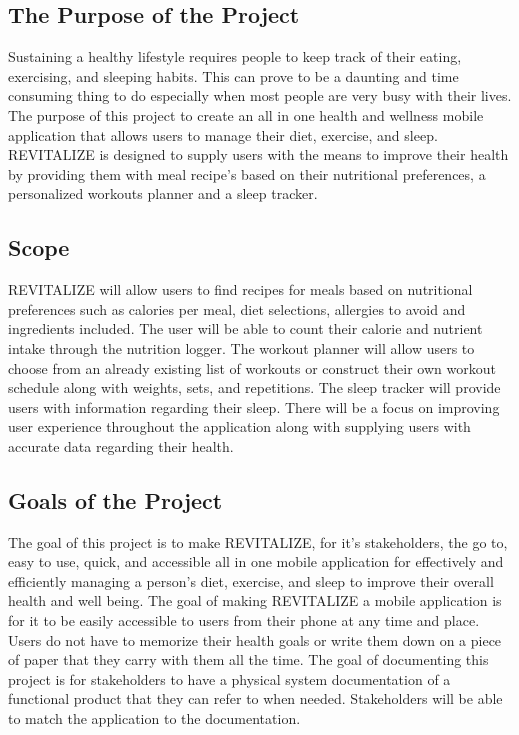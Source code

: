 \documentclass[12pt,letterpaper]{article}
\begin{document}
\subsection{The Purpose of the Project}
Sustaining a healthy lifestyle requires people to keep track of their eating, exercising, and sleeping habits. This can prove to be a daunting and time consuming thing to do especially when most people are very busy with their lives. The purpose of this project to create an all in one health and wellness mobile application that allows users to manage their diet, exercise, and sleep. REVITALIZE is designed to supply users with the means to improve their health by providing them with meal recipe's based on their nutritional preferences, a personalized workouts planner and a sleep tracker. 

\subsection{Scope}
REVITALIZE will allow users to find recipes for meals based on nutritional preferences such as calories per meal, diet selections, allergies to avoid and ingredients included. The user will be able to count their calorie and nutrient intake through the nutrition logger. The workout planner will allow users to choose from an already existing list of workouts or construct their own workout schedule along with weights, sets, and repetitions. The sleep tracker will provide users with information regarding their sleep. There will be a focus on improving user experience throughout the application along with supplying users with accurate data regarding their health.

\subsection{Goals of the Project}
The goal of this project is to make REVITALIZE, for it's stakeholders, the go to, easy to use, quick, and accessible all in one mobile application for effectively and efficiently managing a person's diet, exercise, and sleep to improve their overall health and well being. The goal of making REVITALIZE a mobile application is for it to be easily accessible to users from their phone at any time and place. Users do not have to memorize their health goals or write them down on a piece of paper that they carry with them all the time. The goal of documenting this project is for stakeholders to have a physical system documentation of a functional product that they can refer to when needed. Stakeholders will be able to match the application to the documentation.
\end{document}
